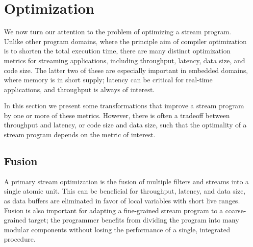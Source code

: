 \section{Optimization}

We now turn our attention to the problem of optimizing a stream
program.  Unlike other program domains, where the principle aim of
compiler optimization is to shorten the total execution time, there
are many distinct optimization metrics for streaming applications,
including throughput, latency, data size, and code size.  The latter
two of these are especially important in embedded domains, where
memory is in short supply; latency can be critical for real-time
applications, and throughput is always of interest.

%

In this section we present some transformations that improve a stream
program by one or more of these metrics.  However, there is often a
tradeoff between throughput and latency, or code size and data size,
such that the optimality of a stream program depends on the metric of
interest.

\subsection{Fusion}

A primary stream optimization is the fusion of multiple filters and
streams into a single atomic unit.  This can be beneficial for
throughput, latency, and data size, as data buffers are eliminated in
favor of local variables with short live ranges.  Fusion is also
important for adapting a fine-grained stream program to a
coarse-grained target; the programmer benefits from dividing the
program into many modular components without losing the performance of
a single, integrated procedure.

